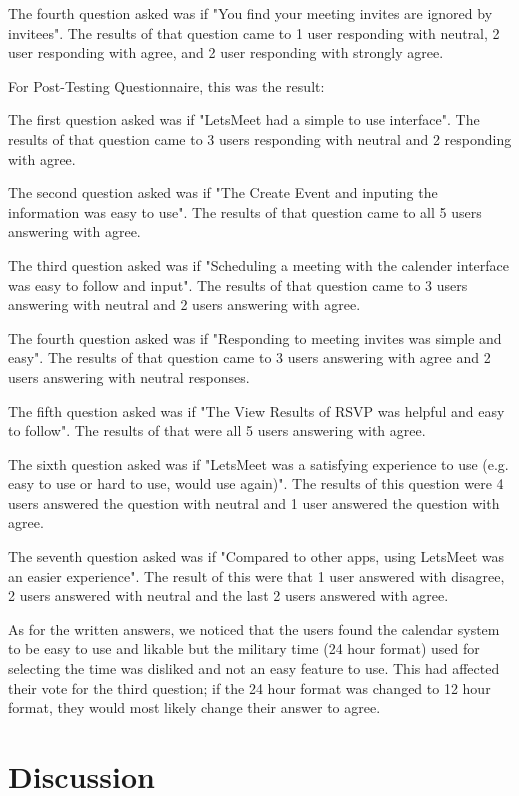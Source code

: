 \documentclass{sigchi}
\begin{document}
The fourth question asked was if "You find your meeting invites are ignored by invitees". The results of that question came to 1 user responding with neutral, 2 user responding with agree, and 2 user responding with strongly agree.

For Post-Testing Questionnaire, this was the result:

The first question asked was if "LetsMeet had a simple to use interface". The results of that question came to 3 users responding with neutral and 2 responding with agree.

The second question asked was if "The Create Event and inputing the information was easy to use". The results of that question came to all 5 users answering with agree.

The third question asked was if "Scheduling a meeting with the calender interface was easy to follow and input". The results of that question came to 3 users answering with neutral and 2 users answering with agree.

The fourth question asked was if "Responding to meeting invites was simple and easy". The results of that question came to 3 users answering with agree and 2 users answering with neutral responses.

The fifth question asked was if "The View Results of RSVP was helpful and easy to follow". The results of that were all 5 users answering with agree.

The sixth question asked was if "LetsMeet was a satisfying experience to use (e.g. easy to use or hard to use, would use again)". The results of this question were 4 users answered the question with neutral and 1 user answered the question with agree.

The seventh question asked was if "Compared to other apps, using LetsMeet was an easier experience". The result of this were that 1 user answered with disagree, 2 users answered with neutral and the last 2 users answered with agree.

As for the written answers, we noticed that the users found the calendar system to be easy to use and likable but the military time (24 hour format) used for selecting the time was disliked and not an easy feature to use. This had affected their vote for the third question; if the 24 hour format was changed to 12 hour format, they would most likely change their answer to agree.

\section{Discussion}
\end{document}

